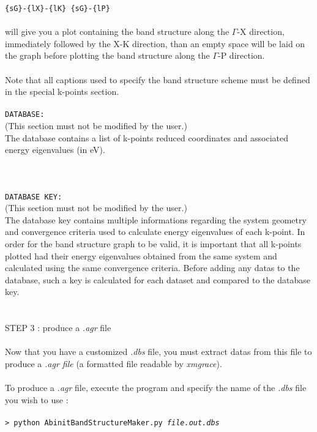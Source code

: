 \documentclass{article}
\begin{document}
\texttt{\{sG\}-\{lX\}-\{lK\} \{sG\}-\{lP\}} \\
\\
will give you a plot containing the band structure along the $\Gamma$-X direction, immediately followed by the X-K direction, than an empty space will be laid on the graph before plotting the band structure along the $\Gamma$-P direction. \\
\\
Note that all captions used to specify the band structure scheme must be defined in the special k-points section.\\
\\
\texttt{DATABASE:} \\
(This section must not be modified by the user.)\\
The database contains a list of k-points reduced coordinates and associated energy eigenvalues (in eV). \\
\\
\\
\\
\texttt{DATABASE KEY:} \\
(This section must not be modified by the user.) \\
The database key contains multiple informations regarding the system geometry and convergence criteria used to calculate energy eigenvalues of each k-point. In order for the band structure graph to be valid, it is important that all k-points plotted had their energy eigenvalues obtained from the same system and calculated using the same convergence criteria. Before adding any datas to the database, such a key is calculated for each dataset and compared to the database key. \\
\\
\\
{\large{STEP 3 : produce a \textit{.agr} file}} \\
\\
Now that you have a customized \textit{.dbs} file, you must extract datas from this file to produce a \textit{.agr file} (a formatted file readable by \textit{xmgrace}). \\
\\
To produce a \textit{.agr} file, execute the program and specify the name of the \textit{.dbs} file you wish to use : \\
\\
\texttt{> python AbinitBandStructureMaker.py \textit{file.out.dbs}} \\
\end{document}
